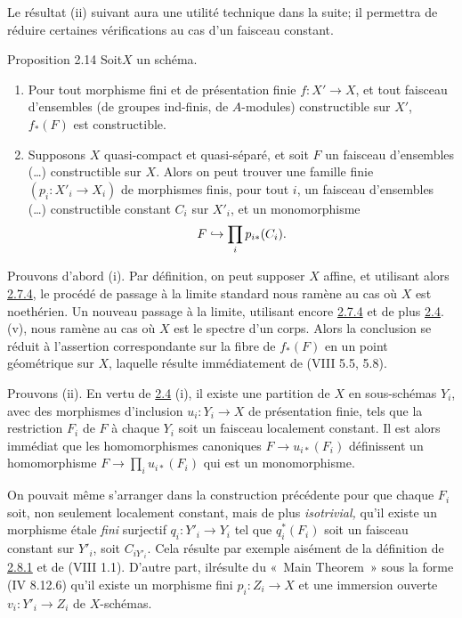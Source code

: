 \documentclass[10pt]{../fichiers-configuration-latex/smfart}
\begin{document}
Le résultat (ii) suivant aura une utilité technique dans la suite; il
permettra de réduire certaines vérifications au cas d'un faisceau
constant.

\begin{enonce*}{Proposition 2.14}
Soit\pageoriginale $X$ un schéma.
\begin{enumerate}
\renewcommand{\theenumi}{\roman{enumi}}
\renewcommand{\labelenumi}{(\theenumi)}
\item Pour tout morphisme fini et de présentation finie
$f:X'\rightarrow X$, et tout faisceau d'ensembles (\resp de groupes
ind-finis, \resp de $A$-modules) constructible sur $X'$, $f_{\ast}(F)$
est constructible.

\item Supposons $X$ quasi-compact et quasi-séparé, et soit $F$ un
faisceau d'ensembles (\resp\ldots) constructible sur $X$. Alors on
peut trouver une famille finie $(p_i:X'_i\rightarrow X_i)$ de
morphismes finis, pour tout $i$, un faisceau d'ensembles (\resp\ldots)
constructible constant $C_i$ sur $X'_i$, et un monomorphisme
$$
F\hookrightarrow \prod_i p_{i\ast}(C_i){}.
$$
\end{enumerate}
\end{enonce*}

Prouvons d'abord (i). Par définition, on peut supposer $X$ affine, et
utilisant alors \hyperref[IX.cor2.7.4]{2.7.4}, le procédé de passage à la limite standard nous
ramène au cas où $X$ est noethérien. Un nouveau passage à la limite,
utilisant encore \hyperref[IX.cor2.7.4]{2.7.4} et de plus \hyperref[IX.prop2.4]{2.4}. (v), nous ramène au cas où $X$ est le spectre d'un corps. Alors la conclusion se réduit à l'assertion
correspondante sur la fibre de $f_{\ast}(F)$ en un point géométrique
sur $X$, laquelle résulte immédiatement de (VIII 5.5, 5.8).

Prouvons (ii). En vertu de \hyperref[IX.prop2.4]{2.4} (i), il existe une partition de $X$ en
sous-schémas $Y_i$, avec des morphismes d'inclusion
$u_i:Y_i\rightarrow X$ de présentation finie, tels que la restriction
$F_i$ de $F$ à chaque $Y_i$ soit un faisceau localement constant. Il
est alors immédiat que les homomorphismes canoniques $F\rightarrow
u_{i\ast}(F_i)$ définissent un homomorphisme $F\rightarrow \prod_i
u_{i\ast}(F_i)$ qui est un monomorphisme.

On pouvait même s'arranger dans la construction précédente pour que
chaque $F_i$ soit, non seulement localement constant, mais de plus
\emph{isotrivial,} \ie qu'il existe un morphisme étale \emph{fini}
surjectif $q_i:Y'_i\rightarrow Y_i$ tel que $q^{\ast}_i(F_i)$ soit un
faisceau constant sur $Y'_i$, soit $C_{iY'_i}$. Cela résulte par
exemple aisément de la définition de \hyperref[IX.lem2.8.1]{2.8.1} et de (VIII 1.1). D'autre
part, il\pageoriginale résulte du « Main Theorem »  sous la forme
(\EGA IV 8.12.6) qu'il existe un morphisme fini $p_i:Z_i\rightarrow X$
et une immersion ouverte $v_i:Y'_i\rightarrow Z_i$ de $X$-schémas.
\end{document}
